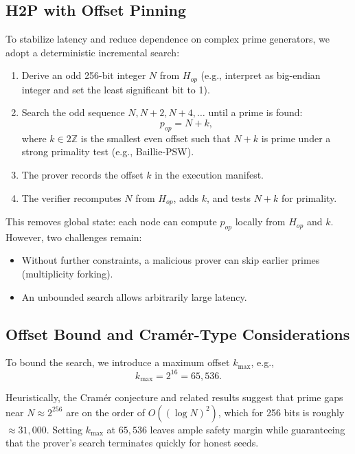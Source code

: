 \documentclass[11pt]{article}
\begin{document}
\subsection{H2P with Offset Pinning}

To stabilize latency and reduce dependence on complex prime generators, we adopt a deterministic incremental search:

\begin{enumerate}[leftmargin=*]
  \item Derive an odd 256-bit integer \( N \) from \( H_{op} \) (e.g., interpret as big-endian integer and set the least significant bit to 1).
  \item Search the odd sequence \( N, N+2, N+4, \dots \) until a prime is found:
  \[
    p_{op} = N + k,
  \]
  where \( k \in 2\mathbb{Z} \) is the smallest even offset such that \( N + k \) is prime under a strong primality test (e.g., Baillie-PSW).
  \item The prover records the offset \( k \) in the execution manifest.
  \item The verifier recomputes \( N \) from \( H_{op} \), adds \( k \), and tests \( N + k \) for primality.
\end{enumerate}

This removes global state: each node can compute \( p_{op} \) locally from \( H_{op} \) and \( k \). However, two challenges remain:
\begin{itemize}[leftmargin=*]
  \item Without further constraints, a malicious prover can skip earlier primes (multiplicity forking).
  \item An unbounded search allows arbitrarily large latency.
\end{itemize}

\subsection{Offset Bound and Cramér-Type Considerations}

To bound the search, we introduce a maximum offset \( k_{\max} \), e.g.,
\[
  k_{\max} = 2^{16} = 65{,}536.
\]

Heuristically, the Cramér conjecture and related results suggest that prime gaps near \( N \approx 2^{256} \) are on the order of \( O((\log N)^2) \), which for 256 bits is roughly \( \approx 31{,}000 \). Setting \( k_{\max} \) at \( 65{,}536 \) leaves ample safety margin while guaranteeing that the prover's search terminates quickly for honest seeds.
\end{document}
